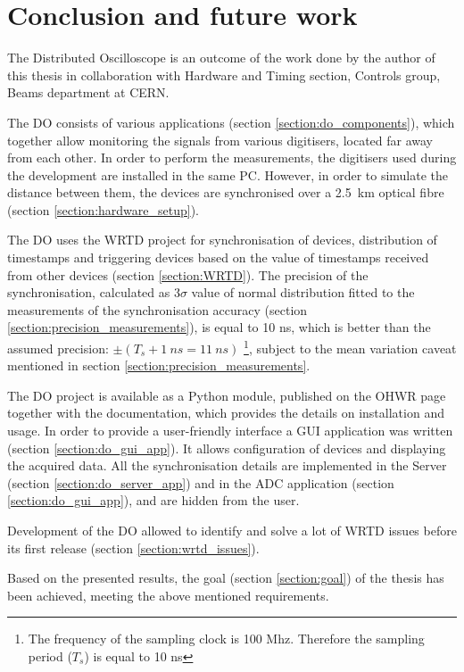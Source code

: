 \chapter{Conclusion and future work}

The Distributed Oscilloscope is an outcome of the work done by the author of this thesis in collaboration with Hardware and Timing section, Controls group, Beams department at CERN.

The DO consists of various applications (section \ref{section:do_components}), which together allow monitoring the signals from various digitisers, located far away from each other. In order to perform the measurements, the digitisers used during the development are installed in the same PC. However, in order to simulate the distance between them, the devices are synchronised over a 2.5~km optical fibre (section \ref{section:hardware_setup}). 

The DO uses the WRTD project for synchronisation of devices, distribution of timestamps and triggering devices based on the value of timestamps received from other devices (section \ref{section:WRTD}). The precision of the synchronisation, calculated as 3$\sigma$ value of normal distribution fitted to the measurements of the synchronisation accuracy (section \ref{section:precision_measurements}), is equal to 10 ns, which is better than the assumed precision: $\pm (T_s + 1~ns = 11~ns)$ \footnote{The frequency of the sampling clock is 100 Mhz. Therefore the sampling period ($T_s$) is equal to 10 ns}, subject to the mean variation caveat mentioned in section \ref{section:precision_measurements}.

The DO project is available as a Python module, published on the OHWR page \cite{distributed_oscilloscope} together with the documentation, which provides the details on installation and usage. In order to provide a user-friendly interface a GUI application was written (section \ref{section:do_gui_app}). It allows configuration of devices and displaying the acquired data. All the synchronisation details are implemented in the Server (section \ref{section:do_server_app}) and in the ADC application (section \ref{section:do_gui_app}), and are hidden from the user. 

Development of the DO allowed to identify and solve a lot of WRTD issues before its first release (section \ref{section:wrtd_issues}).

Based on the presented results, the goal (section \ref{section:goal}) of the thesis has been achieved, meeting the above mentioned requirements.


